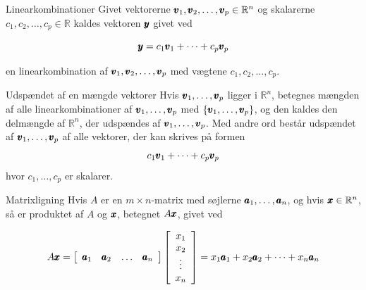 \begin{definition}{Linearkombinationer}
    Givet vektorerne $\pmb{v}_1, \pmb{v}_2, \ldots, \pmb{v}_p \in \mathbb{R}^n$ og skalarerne $c_1, c_2, \ldots, c_p \in \mathbb{R}$ kaldes vektoren $\pmb{y}$ givet ved

\[
\pmb{y} = c_1 \pmb{v}_1 + \cdots + c_p \pmb{v}_p
\]

en linearkombination af $\pmb{v}_1, \pmb{v}_2, \ldots, \pmb{v}_p$ med vægtene $c_1, c_2, \ldots, c_p$.

\end{definition}

\begin{definition}{Udspændet af en mængde vektorer}
    Hvis $\pmb{v}_1, \ldots, \pmb{v}_p$ ligger i $\mathbb{R}^n$, betegnes mængden af alle linearkombinationer af $\pmb{v}_1, \ldots, \pmb{v}_p$ med  $\left\{\pmb{v}_1, \ldots, \pmb{v}_p\right\}$, og den kaldes den delmængde af $\mathbb{R}^n$, der udspændes af $\pmb{v}_1, \ldots, \pmb{v}_p$. Med andre ord består udspændet af $\pmb{v}_1, \ldots, \pmb{v}_p$ af alle vektorer, der kan skrives på formen
    $$
    c_1 \pmb{v}_1 + \cdots + c_p \pmb{v}_p
    $$
    hvor $c_1, \ldots, c_p$ er skalarer.

\end{definition}

\begin{definition}{Matrixligning}
  Hvis $A$ er en $m \times n$-matrix med søjlerne $\pmb{a}_1, \ldots, \pmb{a}_n$, og hvis $\pmb{x} \in \mathbb{R}^n$, så er produktet af $A$ og $\pmb{x}$, betegnet $A \pmb{x}$, givet ved

\[
A \pmb{x} = \left[\begin{array}{llll}
\pmb{a}_1 & \pmb{a}_2 & \ldots & \pmb{a}_n
\end{array}\right] \left[\begin{array}{c}
x_1 \\
x_2 \\
\vdots \\
x_n
\end{array}\right] = x_1 \pmb{a}_1 + x_2 \pmb{a}_2 + \cdots + x_n \pmb{a}_n
\]
    
\end{definition}


